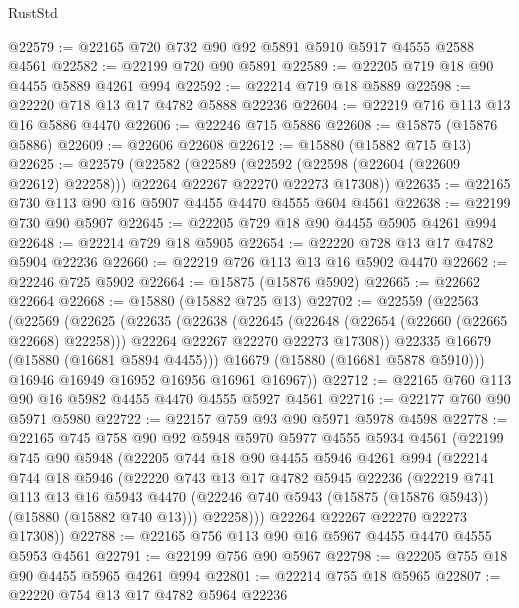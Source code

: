 \begin{lexlean}{RustStd}
\begin{coremodule}
@22579 := @22165 @720 @732 @90 @92 @5891 @5910 @5917 @4555 @2588 @4561
@22582 := @22199 @720 @90 @5891
@22589 := @22205 @719 @18 @90 @4455 @5889 @4261 @994
@22592 := @22214 @719 @18 @5889
@22598 := @22220 @718 @13 @17 @4782 @5888 @22236
@22604 := @22219 @716 @113 @13 @16 @5886 @4470
@22606 := @22246 @715 @5886
@22608 := @15875 (@15876 @5886)
@22609 := @22606 @22608
@22612 := @15880 (@15882 @715 @13)
@22625 := @22579
    (@22582
      (@22589 (@22592 (@22598 (@22604 (@22609 @22612) @22258))) @22264 @22267 @22270 @22273 @17308))
@22635 := @22165 @730 @113 @90 @16 @5907 @4455 @4470 @4555 @604 @4561
@22638 := @22199 @730 @90 @5907
@22645 := @22205 @729 @18 @90 @4455 @5905 @4261 @994
@22648 := @22214 @729 @18 @5905
@22654 := @22220 @728 @13 @17 @4782 @5904 @22236
@22660 := @22219 @726 @113 @13 @16 @5902 @4470
@22662 := @22246 @725 @5902
@22664 := @15875 (@15876 @5902)
@22665 := @22662 @22664
@22668 := @15880 (@15882 @725 @13)
@22702 := @22559
    (@22563
      (@22569
        (@22625
          (@22635
            (@22638
              (@22645
                (@22648 (@22654 (@22660 (@22665 @22668) @22258)))
                @22264
                @22267
                @22270
                @22273
                @17308))
            @22335
            @16679
            (@15880 (@16681 @5894 @4455)))
          @16679
          (@15880 (@16681 @5878 @5910)))
        @16946
        @16949
        @16952
        @16956
        @16961
        @16967))
@22712 := @22165 @760 @113 @90 @16 @5982 @4455 @4470 @4555 @5927 @4561
@22716 := @22177 @760 @90 @5971 @5980
@22722 := @22157 @759 @93 @90 @5971 @5978 @4598
@22778 := @22165
    @745
    @758
    @90
    @92
    @5948
    @5970
    @5977
    @4555
    @5934
    @4561
    (@22199
      @745
      @90
      @5948
      (@22205
        @744
        @18
        @90
        @4455
        @5946
        @4261
        @994
        (@22214
          @744
          @18
          @5946
          (@22220
            @743
            @13
            @17
            @4782
            @5945
            @22236
            (@22219
              @741
              @113
              @13
              @16
              @5943
              @4470
              (@22246 @740 @5943 (@15875 (@15876 @5943)) (@15880 (@15882 @740 @13)))
              @22258)))
        @22264
        @22267
        @22270
        @22273
        @17308))
@22788 := @22165 @756 @113 @90 @16 @5967 @4455 @4470 @4555 @5953 @4561
@22791 := @22199 @756 @90 @5967
@22798 := @22205 @755 @18 @90 @4455 @5965 @4261 @994
@22801 := @22214 @755 @18 @5965
@22807 := @22220 @754 @13 @17 @4782 @5964 @22236

\end{coremodule}
\end{lexlean}

